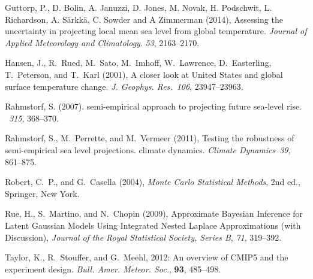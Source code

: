 \documentclass[wrr, draft]{agutex}
\begin{document}
\begin{article}
\begin{thebibliography}{37}
Guttorp, P., D. Bolin, A. Januzzi, D. Jones, M. Novak, H. Podschwit, L. Richardson, A.
S\"{a}rkk\"{a}, C. Sowder and A Zimmerman (2014), Assessing the uncertainty in projecting local
mean sea level from global temperature. \textit{Journal of Applied Meteorology and Climatology}.
\textit{53}, 2163--2170.
  
Hansen, J., R.~Rued, M.~Sato, M.~Imhoff, W.~Lawrence, D.~Easterling,
  T.~Peterson, and T.~Karl (2001),
A closer look at {U}nited {S}tates and global surface temperature
  change. {\em J. Geophys. Res.\/}~{\em 106}, 23947--23963.

  
Rahmstorf, S. (2007).
 semi-empirical approach to projecting future sea-level rise.
~{\em 315}, 368--370.

Rahmstorf, S., M.~Perrette, and M.~Vermeer (2011),
Testing the robustness of semi-empirical sea level projections.
  climate dynamics.
{\em Climate Dynamics}~{\em 39}, 861--875.

Robert, C.~P., and G.~Casella (2004), \textit{Monte Carlo Statistical Methods},
  2nd ed., Springer, New York.

Rue, H., S.~Martino, and N.~Chopin (2009), {Approximate {B}ayesian Inference
  for Latent {G}aussian Models Using Integrated Nested {L}aplace Approximations
  (with Discussion)}, \textit{Journal of the Royal Statistical Society, Series
  B}, \textit{71}, 319--392.

Taylor, K., R.~Stouffer, and G.~Meehl, 2012: An overview of {CMIP}5 and the
  experiment design. \textit{Bull. Amer. Meteor. Soc.}, \textbf{93}, 485--498.

\end{thebibliography}

\end{article}

\end{document}
